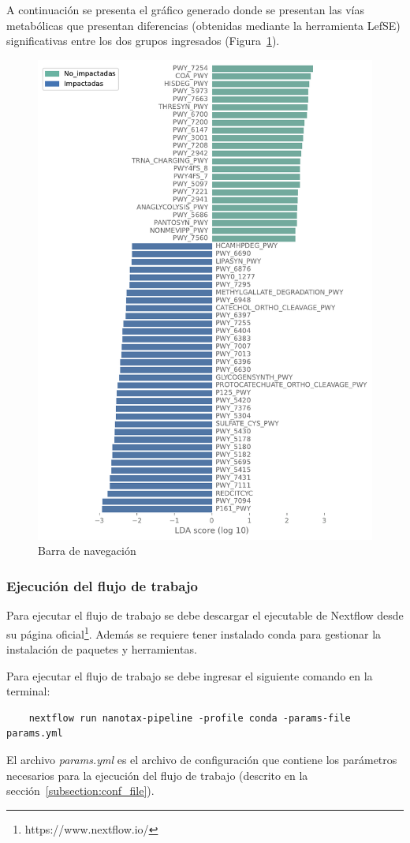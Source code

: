 A continuación se presenta el gráfico generado donde se presentan las vías metabólicas que presentan diferencias (obtenidas mediante la herramienta LefSE) significativas entre los dos grupos ingresados  (Figura~\ref{fig:pipeline-lefse}).
    \begin{figure}[H]
        \includegraphics[width=0.7\linewidth]{images/pipeline/lefse_plot.pdf}
        \caption{Barra de navegación}
        \label{fig:pipeline-lefse}
    \end{figure}
\subsubsection{Ejecución del flujo de trabajo}\label{pipeline:how_to_run}
Para ejecutar el flujo de trabajo se debe descargar el ejecutable de Nextflow desde su página oficial\footnote{https://www.nextflow.io/}. 
Además se requiere tener instalado conda para gestionar la instalación de paquetes y herramientas.

Para ejecutar el flujo de trabajo se debe ingresar el siguiente comando en la terminal:
\begin{verbatim}
    nextflow run nanotax-pipeline -profile conda -params-file params.yml

\end{verbatim}
El archivo \textit{params.yml} es el archivo de configuración que contiene los parámetros necesarios para la ejecución del flujo de trabajo (descrito en la sección~\ref{subsection:conf_file}).

